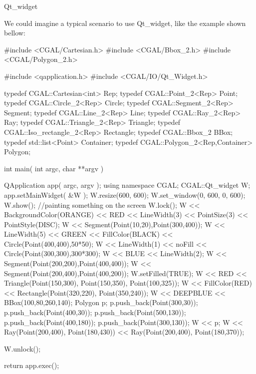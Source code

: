 \begin{ccRefClass}{Qt_widget}





\end{ccRefClass}

\ccExample
We could imagine a typical scenario to use Qt\_widget, like the example shown 
bellow:
\begin{ccExampleCode}
#include <CGAL/Cartesian.h>
#include <CGAL/Bbox_2.h>
#include <CGAL/Polygon_2.h>

#include <qapplication.h>
#include <CGAL/IO/Qt_Widget.h>

typedef CGAL::Cartesian<int> Rep;
typedef CGAL::Point_2<Rep> Point;
typedef CGAL::Circle_2<Rep> Circle;
typedef CGAL::Segment_2<Rep> Segment;
typedef CGAL::Line_2<Rep> Line;
typedef CGAL::Ray_2<Rep> Ray;
typedef CGAL::Triangle_2<Rep> Triangle;
typedef CGAL::Iso_rectangle_2<Rep> Rectangle;
typedef CGAL::Bbox_2 BBox;
typedef std::list<Point> Container;
typedef CGAL::Polygon_2<Rep,Container> Polygon;

int main( int argc, char **argv )
{
    QApplication app( argc, argv );
    using namespace CGAL;
    CGAL::Qt_widget W;
    app.setMainWidget( &W );
    W.resize(600, 600);
    W.set_window(0, 600, 0, 600);
    W.show();
    //painting something on the screen
    W.lock();
    W << BackgroundColor(ORANGE) << RED <<
	  LineWidth(3) << PointSize(3) << PointStyle(DISC);
    W << Segment(Point(10,20),Point(300,400));
    W << LineWidth(5) << GREEN << FillColor(BLACK) <<
      Circle(Point(400,400),50*50);
    W << LineWidth(1) << noFill << Circle(Point(300,300),300*300);
    W << BLUE << LineWidth(2);
    W << Segment(Point(200,200),Point(400,400));
    W << Segment(Point(200,400),Point(400,200));
    W.setFilled(TRUE);
    W << RED << Triangle(Point(150,300),
				   Point(150,350),
				   Point(100,325));
    W << FillColor(RED) << Rectangle(Point(320,220),
					       Point(350,240));
    W << DEEPBLUE << BBox(100,80,260,140);
    Polygon p;
    p.push_back(Point(300,30));
    p.push_back(Point(400,30));
    p.push_back(Point(500,130));
    p.push_back(Point(400,180));
    p.push_back(Point(300,130));
    W << p;
    W << Ray(Point(200,400), Point(180,430))
      << Ray(Point(200,400), Point(180,370));
    
    W.unlock();

    return app.exec();
}
\end{ccExampleCode}

